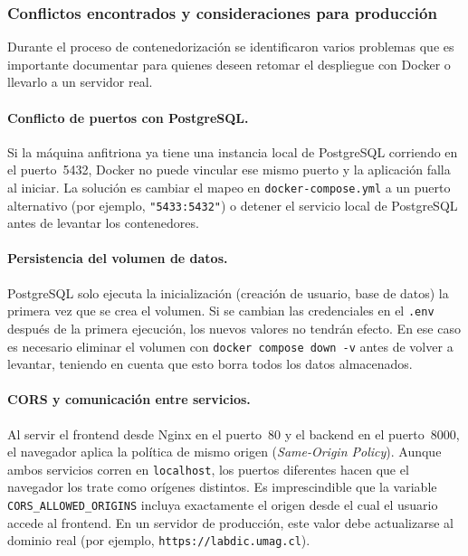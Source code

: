 \subsubsection*{Conflictos encontrados y consideraciones para producción}

Durante el proceso de contenedorización se identificaron varios problemas que es importante
documentar para quienes deseen retomar el despliegue con Docker o llevarlo a un servidor real.

\paragraph{Conflicto de puertos con PostgreSQL.}
Si la máquina anfitriona ya tiene una instancia local de PostgreSQL corriendo en el
puerto~5432, Docker no puede vincular ese mismo puerto y la aplicación falla al iniciar. La
solución es cambiar el mapeo en \texttt{docker-compose.yml} a un puerto alternativo (por
ejemplo, \texttt{"5433:5432"}) o detener el servicio local de PostgreSQL antes de levantar los
contenedores.

\paragraph{Persistencia del volumen de datos.}
PostgreSQL solo ejecuta la inicialización (creación de usuario, base de datos) la primera vez
que se crea el volumen. Si se cambian las credenciales en el \texttt{.env} después de la
primera ejecución, los nuevos valores no tendrán efecto. En ese caso es necesario eliminar el
volumen con \texttt{docker compose down -v} antes de volver a levantar, teniendo en cuenta
que esto borra todos los datos almacenados.

\paragraph{CORS y comunicación entre servicios.}
Al servir el frontend desde Nginx en el puerto~80 y el backend en el puerto~8000, el
navegador aplica la política de mismo origen (\emph{Same-Origin Policy}). Aunque ambos
servicios corren en \texttt{localhost}, los puertos diferentes hacen que el navegador los trate
como orígenes distintos. Es imprescindible que la variable \texttt{CORS\_ALLOWED\_ORIGINS}
incluya exactamente el origen desde el cual el usuario accede al frontend. En un servidor de
producción, este valor debe actualizarse al dominio real (por ejemplo,
\texttt{https://labdic.umag.cl}).

